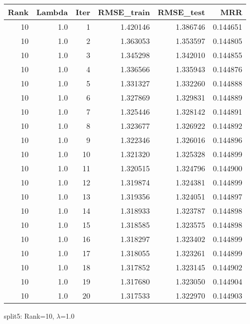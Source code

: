 \begin{tabular}{rrrrrr}
\toprule
 Rank &  Lambda &  Iter &  RMSE\_train &  RMSE\_test &       MRR \\
\midrule
   10 &     1.0 &     1 &    1.420146 &   1.386746 &  0.144651 \\
   10 &     1.0 &     2 &    1.363053 &   1.353597 &  0.144805 \\
   10 &     1.0 &     3 &    1.345298 &   1.342010 &  0.144855 \\
   10 &     1.0 &     4 &    1.336566 &   1.335943 &  0.144876 \\
   10 &     1.0 &     5 &    1.331327 &   1.332260 &  0.144888 \\
   10 &     1.0 &     6 &    1.327869 &   1.329831 &  0.144889 \\
   10 &     1.0 &     7 &    1.325446 &   1.328142 &  0.144891 \\
   10 &     1.0 &     8 &    1.323677 &   1.326922 &  0.144892 \\
   10 &     1.0 &     9 &    1.322346 &   1.326016 &  0.144896 \\
   10 &     1.0 &    10 &    1.321320 &   1.325328 &  0.144899 \\
   10 &     1.0 &    11 &    1.320515 &   1.324796 &  0.144900 \\
   10 &     1.0 &    12 &    1.319874 &   1.324381 &  0.144899 \\
   10 &     1.0 &    13 &    1.319356 &   1.324051 &  0.144897 \\
   10 &     1.0 &    14 &    1.318933 &   1.323787 &  0.144898 \\
   10 &     1.0 &    15 &    1.318585 &   1.323575 &  0.144898 \\
   10 &     1.0 &    16 &    1.318297 &   1.323402 &  0.144899 \\
   10 &     1.0 &    17 &    1.318055 &   1.323261 &  0.144899 \\
   10 &     1.0 &    18 &    1.317852 &   1.323145 &  0.144902 \\
   10 &     1.0 &    19 &    1.317680 &   1.323050 &  0.144904 \\
   10 &     1.0 &    20 &    1.317533 &   1.322970 &  0.144903 \\
\bottomrule
\end{tabular}

\caption{split5: Rank=10, $\lambda$=1.0}
